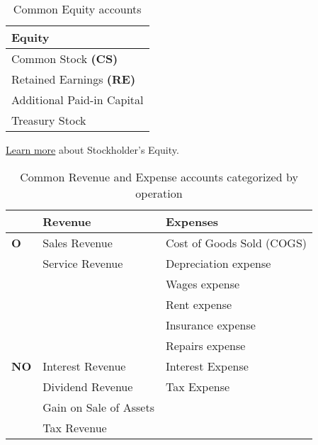 \begin{table}[H]
    \centering
    \begin{tabular}{|p{}|}
        \hline
        \textbf{Equity}                 \\
        \hline
        Common Stock \textbf{(CS)}      \\
        Retained Earnings \textbf{(RE)} \\
        Additional Paid-in Capital      \\
        Treasury Stock                  \\
        \hline
    \end{tabular}
    \caption{Common Equity accounts}
\end{table}

\hyperref[subsec:stockholder]{Learn more} about Stockholder's Equity.

\begin{table}[H]
    \centering
    \begin{tabular}{|l|p{}|p{}|}
        \hline
                    & \textbf{Revenue}       & \textbf{Expenses}         \\
        \hline
        \textbf{O}  & Sales Revenue          & Cost of Goods Sold (COGS) \\
                    & Service Revenue        & Depreciation expense      \\
                    &                        & Wages expense             \\
                    &                        & Rent expense              \\
                    &                        & Insurance expense         \\
                    &                        & Repairs expense           \\
        \hline
        \textbf{NO} & Interest Revenue       & Interest Expense          \\
                    & Dividend Revenue       & Tax Expense               \\
                    & Gain on Sale of Assets &                           \\
                    & Tax Revenue            &                           \\
        \hline
    \end{tabular}
    \caption{Common Revenue and Expense accounts categorized by operation}
\end{table}


